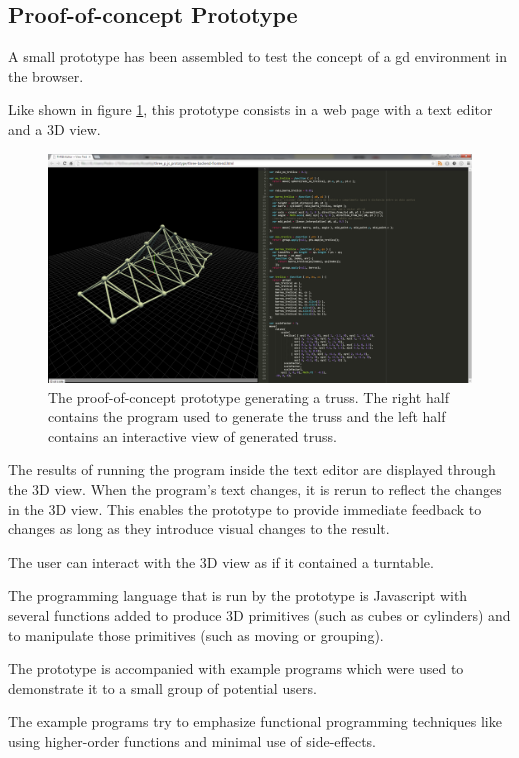 \documentclass{./llncs2e/llncs}
\begin{document}
\subsection{Proof-of-concept Prototype}
	A small prototype has been assembled to test the concept of a \ac{gd} environment in the browser.

	Like shown in figure \ref{fig:proto:3d:p:editor}, this prototype consists in a web page with a text editor and a 3D view.

	\begin{figure}
	  \centering
	  \includegraphics[width=1.0\textwidth]{img/proto_3d_p_editor}
	    \caption{The proof-of-concept prototype generating a truss. The right half contains the program used to generate the truss and the left half contains an interactive view of generated truss.}
	  \label{fig:proto:3d:p:editor}
	\end{figure} 

	The results of running the program inside the text editor are displayed through the 3D view. 
	When the program's text changes, it is rerun to reflect the changes in the 3D view. 
	This enables the prototype to provide immediate feedback to changes as long as they introduce visual changes to the result.

	The user can interact with the 3D view as if it contained a turntable.

	The programming language that is run by the prototype is Javascript with several functions added to produce 3D primitives (such as cubes or cylinders) and to manipulate those primitives (such as moving or grouping).

	The prototype is accompanied with example programs which were used to demonstrate it to a small group of potential users.

	The example programs try to emphasize functional programming techniques like using higher-order functions and minimal use of side-effects.
\end{document}
